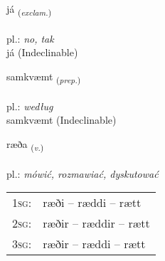 \documentclass[frontgrid, backgrid]{flacards}\usepackage[]{graphicx}\usepackage[]{xcolor}
\begin{document}
{já \small{\textsubscript{(\textit{exclam.})}} \\[1ex]
\textphonetic{[jauː]} \\
pl.: \emph{no, tak} \\  [2ex]
já (Indeclinable)}


\renewcommand{\flhead}{\vskip5pt \fboxsep=0pt {\small\bfseries\footnotesize Forsetning | przyimek}}
\renewcommand{\fcfoot}{\vskip5pt \fboxsep=0pt \hspace{2pt}{\small\bfseries\footnotesize 1K}}

\renewcommand{\blhead}{\vskip5pt {\small\bfseries\footnotesize Forsetning | przyimek }}
\renewcommand{\bcfoot}{\vskip5pt \hspace{2pt}{\small\bfseries\footnotesize 1K}}


{samkvæmt \small{\textsubscript{(\textit{prep.})}} \\[1ex]
\textphonetic{[samkʰvaim̥t]} \\
pl.: \emph{według} \\  [2ex]
samkvæmt (Indeclinable)}

\renewcommand{\flhead}{\vskip5pt \fboxsep=0pt {\small\bfseries\footnotesize Sagnorð | czasownik}}
\renewcommand{\fcfoot}{\vskip5pt \fboxsep=0pt \hspace{2pt}{\small\bfseries\footnotesize 1K}}

\renewcommand{\blhead}{\vskip5pt {\small\bfseries\footnotesize Sagnorð | czasownik }}
\renewcommand{\bcfoot}{\vskip5pt \hspace{2pt}{\small\bfseries\footnotesize 1K}}


{ræða \small{\textsubscript{(\textit{v.})}} \\[1ex] %
\textphonetic{[raiːða]} \\
pl.: \emph{mówić, rozmawiać, dyskutować} \\  [2ex]
\renewcommand*{\arraystretch}{0.8}
\begin{tabular}{p{1cm}l}
\textsc{1sg}: & ræði -- ræddi -- rætt \\ 
\textsc{2sg}: & ræðir -- ræddir -- rætt \\ 
\textsc{3sg}: & ræðir -- ræddi -- rætt \\ 
\end{tabular}
}
\end{document}
